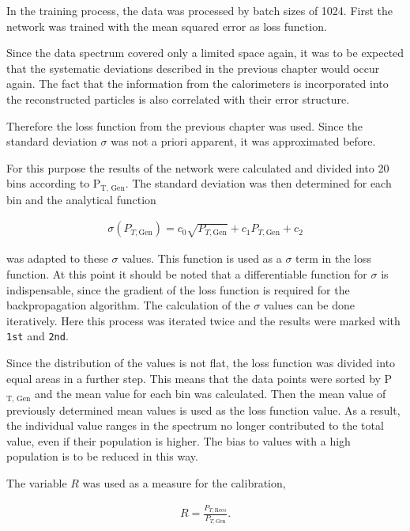 \documentclass[12pt, a4paper]{thesis}
\begin{document}
In the training process, the data was processed by batch sizes
of 1024. First the network was trained with the mean squared error as
loss function.

Since the data spectrum covered only a limited space again, it was to
be expected that the systematic deviations described in the previous
chapter would occur again. The fact that the information from the
calorimeters is incorporated into the reconstructed particles is also
correlated with their error structure.

Therefore the loss function from the previous chapter was used. Since
the standard deviation \(\sigma\) was not a priori apparent, it was
approximated before.

For this purpose the results of the network were calculated and
divided into 20 bins according to P\(_{\text{T, }\text{Gen}}\). The standard deviation
was then determined for each bin and the analytical function 

\begin{align}
\sigma(P_{T, \text{Gen}})= c_0 \sqrt{P_{T, \text{Gen}}}+c_1 P_{T, \text{Gen}} + c_2
\end{align}

was adapted to these \(\sigma\) values. This function is used as a
\(\sigma\) term in the loss function. At this point it should be noted
that a differentiable function for \(\sigma\) is indispensable, since
the gradient of the loss function is required for the backpropagation
algorithm. The calculation of the \(\sigma\) values can be done
iteratively. Here this process was iterated twice and the results were
marked with \texttt{1st} and \texttt{2nd}.


Since the distribution of the values is not flat, the loss function
was divided into equal areas in a further step. This means that the
data points were sorted by P\(_{\text{T, }\text{Gen}}\) and the mean
value for each bin was calculated. Then the mean value of previously
determined mean values is used as the loss function value. As a
result, the individual value ranges in the spectrum no longer
contributed to the total value, even if their population is
higher. The bias to values with a high population is to be reduced in
this way.

The variable \(R\) was used as a measure for the calibration,

\begin{align}
R = \frac{P_{T, \text{Reco}}}{P_{T, \text{Gen}}}.
\end{align}
\end{document}

